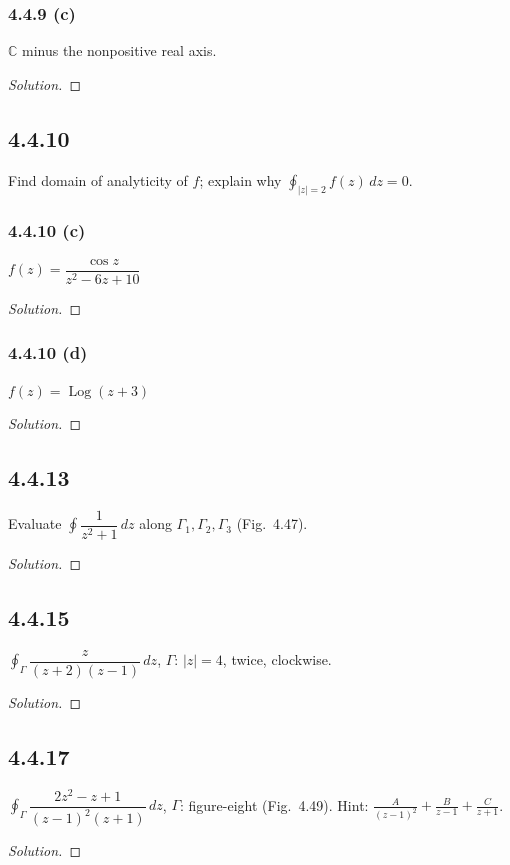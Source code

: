 \documentclass{article}
\newenvironment{solution}{
\begin{proof}[Solution]}{
\end{proof}}
\begin{document}
\subsubsection*{4.4.9 (c)}
$\mathbb{C}$ minus the nonpositive real axis.
\begin{solution}
\end{solution}

\subsection*{4.4.10}
Find domain of analyticity of $f$; explain why $\oint_{|z|=2} f(z)\,dz = 0$.

\subsubsection*{4.4.10 (c)}
$f(z) = \dfrac{\cos z}{z^2-6z+10}$
\begin{solution}
\end{solution}

\subsubsection*{4.4.10 (d)}
$f(z) = \operatorname{Log}(z+3)$
\begin{solution}
\end{solution}

\subsection*{4.4.13}
Evaluate $\oint \dfrac{1}{z^2+1}\,dz$ along $\Gamma_1, \Gamma_2, \Gamma_3$ (Fig.~4.47).
\begin{solution}
\end{solution}

\subsection*{4.4.15}
$\oint_\Gamma \dfrac{z}{(z+2)(z-1)}\,dz$, $\Gamma$: $|z|=4$, twice, clockwise.
\begin{solution}
\end{solution}

\subsection*{4.4.17}
$\oint_\Gamma \dfrac{2z^2-z+1}{(z-1)^2(z+1)}\,dz$, $\Gamma$: figure-eight (Fig.~4.49).
Hint: $\frac{A}{(z-1)^2}+\frac{B}{z-1}+\frac{C}{z+1}$.
\begin{solution}
\end{solution}
\end{document}
